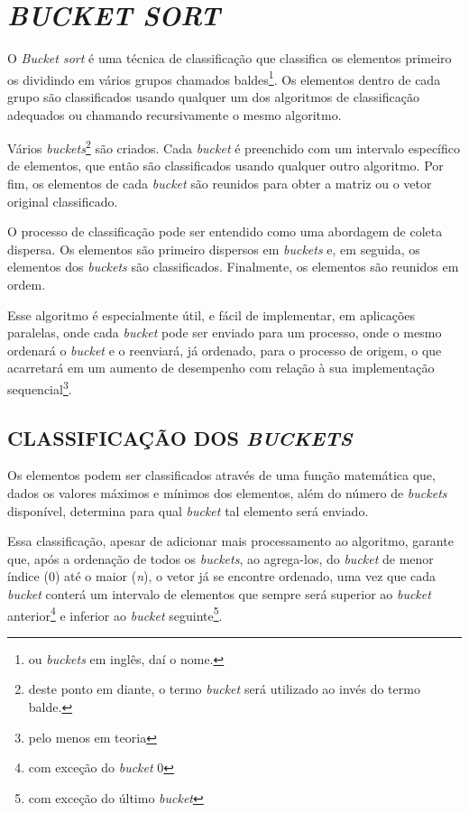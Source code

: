 \section{\normalsize \textit{BUCKET SORT}}\label{bucket}
	O \textit{Bucket sort} é uma técnica de classificação que classifica os elementos primeiro os dividindo em vários grupos chamados baldes\footnote{ou \textit{buckets} em inglês, daí o nome.}. Os elementos dentro de cada grupo são classificados usando qualquer um dos algoritmos de classificação adequados ou chamando recursivamente o mesmo algoritmo.

Vários \textit{buckets}\footnote{deste ponto em diante, o termo \textit{bucket} será utilizado ao invés do termo balde.} são criados. Cada \textit{bucket} é preenchido com um intervalo específico de elementos, que então são  classificados usando qualquer outro algoritmo. Por fim, os elementos de cada \textit{bucket} são reunidos para obter a matriz ou o vetor original classificado.

O processo de classificação pode ser entendido como uma abordagem de coleta dispersa. Os elementos são primeiro dispersos em \textit{buckets} e, em seguida, os elementos dos \textit{buckets} são classificados. Finalmente, os elementos são reunidos em ordem.

Esse algoritmo é especialmente útil, e fácil de implementar, em aplicações paralelas, onde cada \textit{bucket} pode ser enviado para um processo, onde o mesmo ordenará o \textit{bucket} e o reenviará, já ordenado, para o processo de origem, o que acarretará em um aumento de desempenho com relação à sua implementação sequencial\footnote{pelo menos em teoria}.

	\subsection{\normalsize CLASSIFICAÇÃO DOS \textit{BUCKETS}}\label{classification}
		Os elementos podem ser classificados através de uma função matemática que, dados os valores máximos e mínimos dos elementos, além do número de \textit{buckets} disponível, determina para qual \textit{bucket} tal elemento será enviado.
		
		Essa classificação, apesar de adicionar mais processamento ao algoritmo, garante que, após a ordenação de todos os \textit{buckets}, ao agrega-los, do \textit{bucket} de menor índice (0) até o maior (\textit{n}), o vetor já se encontre ordenado, uma vez que cada \textit{bucket} conterá  um intervalo de elementos que sempre será superior ao \textit{bucket} anterior\footnote{com exceção do \textit{bucket} 0} e inferior ao \textit{bucket} seguinte\footnote{com exceção do último \textit{bucket}}.
		
